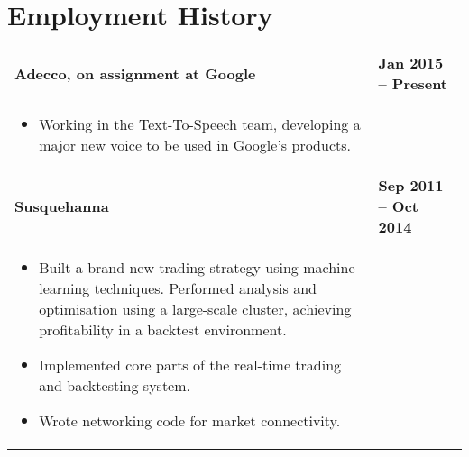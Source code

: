 \documentclass[]{article}
\begin{document}
\section*{Employment History}
\setlength{\tabcolsep}{0.1cm}
\begin{table*}[h!]
\begin{tabular}[h!]{p{12.7cm}l}

\textbf{Adecco, on assignment at Google} & \textbf{Jan 2015 -- Present}\\
\begin{itemize}[noitemsep,topsep=0pt]
\item {Working in the Text-To-Speech team, developing a major new voice to be used in Google's products.}
\end{itemize}

& \\

\textbf{Susquehanna} & \textbf{Sep 2011 -- Oct 2014}\\

\begin{itemize}[noitemsep,topsep=0pt]
\item {Built a brand new trading strategy using machine learning techniques. Performed analysis and optimisation using a large-scale cluster, achieving profitability in a backtest environment.}
\item {Implemented core parts of the real-time trading and backtesting system.}
\item {Wrote networking code for market connectivity.}
\end{itemize}


\end{tabular}
\end{table*}
\end{document}
